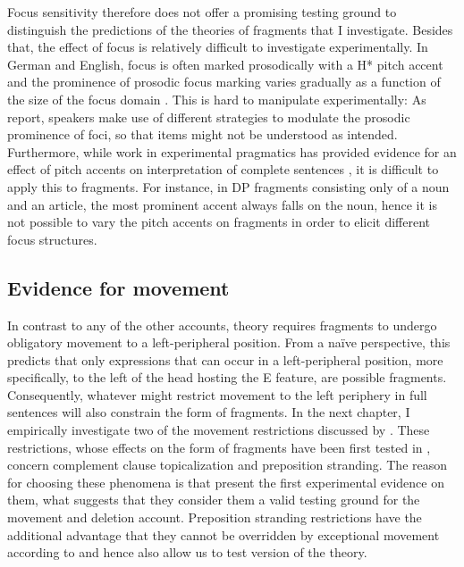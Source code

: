 \largerpage
Focus sensitivity therefore does not offer a promising testing ground to distinguish the predictions of the theories of fragments that I investigate. Besides that, the effect of focus is relatively difficult to investigate experimentally. In German and English, focus is often marked prosodically with a H* pitch accent \citep{gussenhoven1983, pierrehumbert.hirschberg1990} and the prominence of prosodic focus marking varies gradually as a function of the size of the focus domain \citet{baumann.etal2006, baumann.etal2007}. This is hard to manipulate experimentally: As \citet{baumann.etal2007} report, speakers make use of different strategies to modulate the prosodic prominence of foci, so that items might not be understood as intended. Furthermore, while work in experimental pragmatics has provided evidence for an effect of pitch accents on interpretation of complete sentences \citep[see e.g.][]{chevallier.etal2008, zondervan2010}, it is difficult to apply this to fragments. For instance, in DP fragments consisting only of a noun and an article, the most prominent accent always falls on the noun, hence it is not possible to vary the pitch accents on fragments in order to elicit different focus structures.


\subsection{Evidence for movement}
\label{sec:theories-predictions-movement}

In contrast to any of the other accounts,  theory requires fragments to undergo obligatory movement to a left-peripheral position. From a na\"{i}ve perspective, this predicts that only expressions that can occur in a left-peripheral position, more specifically, to the left of the head hosting the E feature, are possible fragments. Consequently, whatever might restrict movement to the left periphery in full sentences will also constrain the form of fragments. In the next chapter, I empirically investigate two of the movement restrictions discussed by \citet{merchant2004}. These restrictions, whose effects on the form of fragments have been first tested in \citet{merchant.etal2013}, concern complement clause topicalization and preposition stranding. The reason for choosing these phenomena is that \citet{merchant.etal2013} present the first experimental evidence on them, what suggests that they consider them a valid testing ground for the movement and deletion account. Preposition stranding restrictions have the additional advantage that they cannot be overridden by exceptional movement according to \citet{weir2015} and hence also allow us to test  version of the theory.

